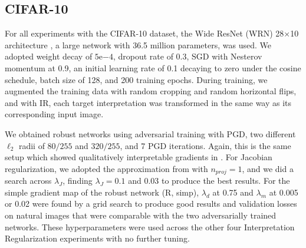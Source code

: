



\subsection{CIFAR-10} \label{subsec:cifar10_experiments}
For all experiments with the CIFAR-10 dataset, the Wide ResNet (WRN) 28$\times$10 architecture \cite{wide_resnet}, a large network with 36.5 million parameters, was used. We adopted weight decay of $5\mathrm{e}{-4}$, dropout rate of 0.3, SGD with Nesterov momentum at 0.9, an initial learning rate of 0.1 decaying to zero under the cosine schedule, batch size of 128, and 200 training epochs. 
During training, we augmented the training data with random cropping and random horizontal flips, and with IR, each target interpretation was transformed in the same way as its corresponding input image.

We obtained robust networks using adversarial training with PGD, two different $\ell_2$ radii of $80/255$ and $320/255$, and 7 PGD iterations. Again, this is the same setup which showed qualitatively interpretable gradients in  \cite{robustness_vs_accuracy}. For Jacobian regularization, we adopted the approximation from \cite{jacobian_reg_approx} with $n_{proj}=1$, and we did a search across $\lambda_J$, finding $\lambda_J = 0.1$ and $0.03$ to produce the best results. 
For the simple gradient map of the robust network (R, simp), $\lambda_d$ at 0.75 and $\lambda_m$ at 0.005 or 0.02 were found by a grid search to produce good results and validation losses on natural images that were comparable with the two adversarially trained networks. These hyperparameters were used across the other four Interpretation Regularization experiments with no further tuning. 

